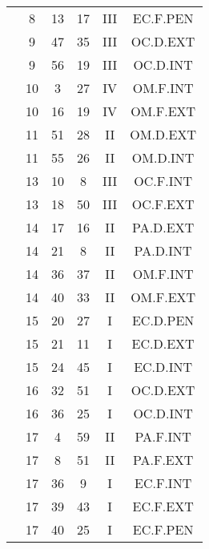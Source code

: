 \documentclass[12pt, a4paper]{article}
\begin{document}
\begin{multicols}{3}
{\begin{tabular}{c c c c c c}
	 	 	 	 & 8 & 13 & 17 & III & EC.F.PEN\\%
	 	 	 	 & 9 & 47 & 35 & III & OC.D.EXT\\%
	 	 	 	 & 9 & 56 & 19 & III & OC.D.INT\\%
	 	 	 	 & 10 & 3 & 27 & IV & OM.F.INT\\%
	 	 	 	 & 10 & 16 & 19 & IV & OM.F.EXT\\%
	 	 	 	 & 11 & 51 & 28 & II & OM.D.EXT\\%
	 	 	 	 & 11 & 55 & 26 & II & OM.D.INT\\%
	 	 	 	 & 13 & 10 & 8 & III & OC.F.INT\\%
	 	 	 	 & 13 & 18 & 50 & III & OC.F.EXT\\%
	 	 	 	 & 14 & 17 & 16 & II & PA.D.EXT\\%
	 	 	 	 & 14 & 21 & 8 & II & PA.D.INT\\%
	 	 	 	 & 14 & 36 & 37 & II & OM.F.INT\\%
	 	 	 	 & 14 & 40 & 33 & II & OM.F.EXT\\%
	 	 	 	 & 15 & 20 & 27 & I & EC.D.PEN\\%
	 	 	 	 & 15 & 21 & 11 & I & EC.D.EXT\\%
	 	 	 	 & 15 & 24 & 45 & I & EC.D.INT\\%
	 	 	 	 & 16 & 32 & 51 & I & OC.D.EXT\\%
	 	 	 	 & 16 & 36 & 25 & I & OC.D.INT\\%
	 	 	 	 & 17 & 4 & 59 & II & PA.F.INT\\%
	 	 	 	 & 17 & 8 & 51 & II & PA.F.EXT\\%
	 	 	 	 & 17 & 36 & 9 & I & EC.F.INT\\%
	 	 	 	 & 17 & 39 & 43 & I & EC.F.EXT\\%
	 	 	 	 & 17 & 40 & 25 & I & EC.F.PEN\\%

\end{tabular}}
\end{multicols}
\end{document}
